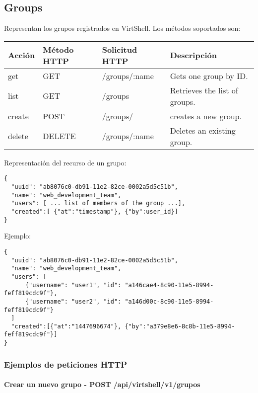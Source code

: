 \subsection{Groups}
Representan los grupos registrados en VirtShell. Los métodos soportados son:

\begin{center}
 \begin{tabular}{| l | l | l | l |}
 \hline
  \rowcolor{blueapi}
  \textbf{Acción} & \textbf{Método HTTP} & \textbf{Solicitud HTTP} & \textbf{Descripción} \\ [0.5ex] 
  \hline\hline
  get & GET & /groups/:name & Gets one group by ID. \\
  \hline
  list & GET & /groups & Retrieves the list of groups. \\  
  \hline
  create & POST & /groups/ & creates a new group. \\
  \hline
  delete & DELETE & /groups/:name & Deletes an existing group. \\
  \hline
\end{tabular}
\end{center}

\vspace{1cm}
Representación del recurso de un grupo:
\vspace{1cm}

\begin{lstlisting}[style=json]
{
  "uuid": "ab8076c0-db91-11e2-82ce-0002a5d5c51b",
  "name": "web_development_team",
  "users": [ ... list of members of the group ...],  
  "created":[ {"at":"timestamp"}, {"by":user_id}]
}
\end{lstlisting}

Ejemplo:

\medskip
\begin{lstlisting}[style=json]
{
  "uuid": "ab8076c0-db91-11e2-82ce-0002a5d5c51b",
  "name": "web_development_team",
  "users": [ 
      {"username": "user1", "id": "a146cae4-8c90-11e5-8994-feff819cdc9f"},
      {"username": "user2", "id": "a146d00c-8c90-11e5-8994-feff819cdc9f"}
  ]
  "created":[{"at":"1447696674"}, {"by":"a379e8e6-8c8b-11e5-8994-feff819cdc9f"}]
}
\end{lstlisting}

\subsubsection{Ejemplos de peticiones HTTP}

\paragraph{Crear un nuevo grupo - POST /api/virtshell/v1/grupos} ~\\

